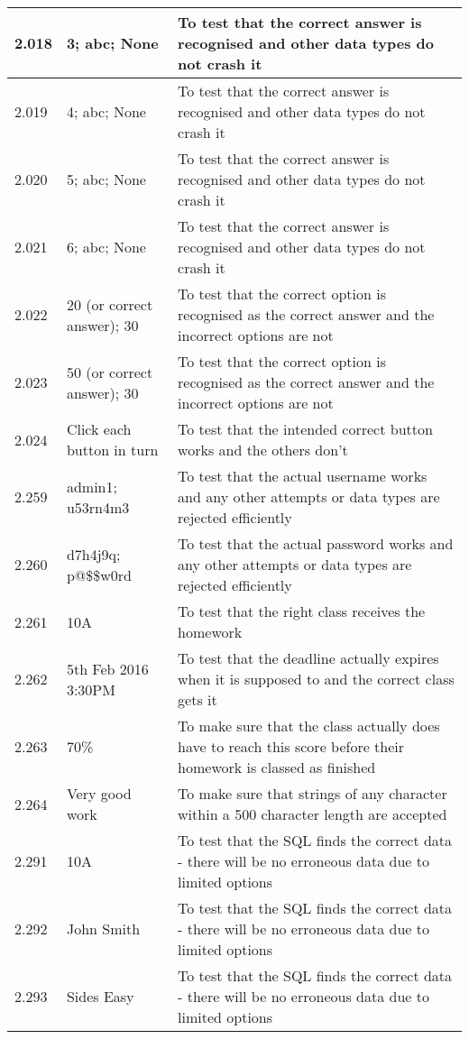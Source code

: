 \begin{landscape}
\begin{center}
\begin{longtable}{|p{4cm}|p{4cm}|p{5cm}|}
2.018 & 3; abc; None & To test that the correct answer is recognised and other data types do not crash it \\ \hline
2.019 & 4; abc; None & To test that the correct answer is recognised and other data types do not crash it \\ \hline
2.020 & 5; abc; None & To test that the correct answer is recognised and other data types do not crash it \\ \hline
2.021 & 6; abc; None & To test that the correct answer is recognised and other data types do not crash it \\ \hline
2.022 & 20 (or correct answer); 30 & To test that the correct option is recognised as the correct answer and the incorrect options are not \\ \hline
2.023 & 50 (or correct answer); 30 & To test that the correct option is recognised as the correct answer and the incorrect options are not \\ \hline
2.024 & Click each button in turn & To test that the intended correct button works and the others don't \\ \hline
2.259 & admin1; u53rn4m3 & To test that the actual username works and any other attempts or data types are rejected efficiently \\ \hline
2.260 & d7h4j9q; p@\$\$w0rd & To test that the actual password works and any other attempts or data types are rejected efficiently \\ \hline
2.261 & 10A & To test that the right class receives the homework \\ \hline
2.262 & 5th Feb 2016 3:30PM & To test that the deadline actually expires when it is supposed to and the correct class gets it \\ \hline
2.263 & 70\% & To make sure that the class actually does have to reach this score before their homework is classed as finished \\ \hline
2.264 & Very good work & To make sure that strings of any character within a 500 character length are accepted \\ \hline
2.291 & 10A & To test that the SQL finds the correct data - there will be no erroneous data due to limited options\\ \hline
2.292 & John Smith & To test that the SQL finds the correct data - there will be no erroneous data due to limited options \\ \hline
2.293 & Sides Easy & To test that the SQL finds the correct data - there will be no erroneous data due to limited options \\ \hline

\end{longtable}
\end{center}
\end{landscape}
